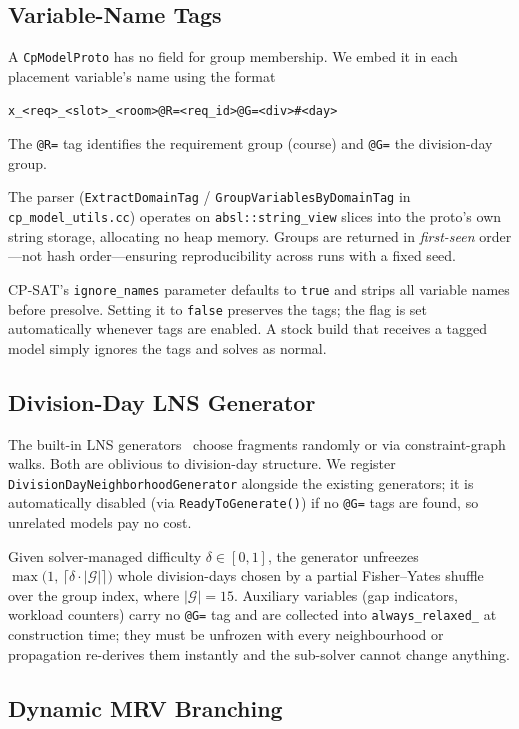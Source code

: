\documentclass[conference]{IEEEtran}
\begin{document}
\subsection{Variable-Name Tags}\label{sec:tags}
A \texttt{CpModelProto} has no field for group membership. We embed
it in each placement variable's name using the format
\begin{center}
  \texttt{x\_<req>\_<slot>\_<room>@R=<req\_id>@G=<div>\#<day>}
\end{center}
The \texttt{@R=} tag identifies the requirement group (course) and \texttt{@G=}
the division-day group.

The parser (\texttt{ExtractDomainTag} / \texttt{GroupVariablesByDomainTag}
in \texttt{cp\_model\_utils.cc}) operates on \texttt{absl::string\_view}
slices into the proto's own string storage, allocating no heap memory. Groups
are returned in \emph{first-seen} order---not hash order---ensuring
reproducibility across runs with a fixed seed.

CP-SAT's \texttt{ignore\_names} parameter defaults to \texttt{true} and
strips all variable names before presolve. Setting it to \texttt{false}
preserves the tags; the flag is set automatically whenever tags are enabled.
A stock build that receives a tagged model simply ignores the tags and solves
as normal.

\subsection{Division-Day LNS Generator}\label{sec:lns}
The built-in LNS generators~\cite{Perron2023} choose fragments randomly or
via constraint-graph walks. Both are oblivious to division-day structure.
We register \texttt{DivisionDayNeighborhoodGenerator} alongside the existing
generators; it is automatically disabled (via \texttt{ReadyToGenerate()}) if
no \texttt{@G=} tags are found, so unrelated models pay no cost.

Given solver-managed difficulty $\delta \in [0,1]$, the generator unfreezes
$\max\!\bigl(1,\, \lceil\delta \cdot |\mathcal{G}|\rceil\bigr)$ whole
division-days chosen by a partial Fisher--Yates shuffle over the group index,
where $|\mathcal{G}|=15$. Auxiliary variables (gap indicators, workload
counters) carry no \texttt{@G=} tag and are collected into
\texttt{always\_relaxed\_} at construction time; they must be unfrozen with
every neighbourhood or propagation re-derives them instantly and the sub-solver
cannot change anything.

\subsection{Dynamic MRV Branching}\label{sec:mrv}
\end{document}
